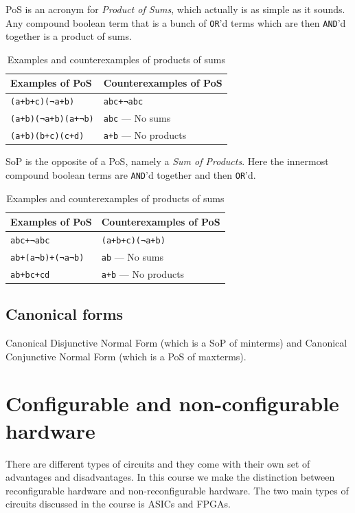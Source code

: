 \documentclass[a4paper,11pt]{report}
\newcommand{\enot}{¬}
\begin{document}
PoS is an acronym for \textit{Product of Sums}, which actually is as
simple as it sounds. Any compound boolean term that is a bunch of
\texttt{OR}'d terms which are then \texttt{AND}'d together is a
product of sums.

\begin{table}[H]
  \centering
  \begin{tabular}{l | l}
    \textbf{Examples of PoS} & \textbf{Counterexamples of PoS} \\ \hline
    \texttt{(a+b+c)(\enot{a}+b)}           & \texttt{abc+\enot{a}bc} \\
    \texttt{(a+b)(\enot{a}+b)(a+\enot{b})} & \texttt{abc} --- No sums \\
    \texttt{(a+b)(b+c)(c+d)}               & \texttt{a+b} --- No products
  \end{tabular}
  \caption[Example of PoS]{Examples and counterexamples of products of sums}%
  \label{tab:pos}
\end{table}

SoP is the opposite of a PoS, namely a \textit{Sum of Products}. Here
the innermost compound boolean terms are \texttt{AND}'d together and
then \texttt{OR}'d.

\begin{table}[H]
  \centering
  \begin{tabular}{l | l}
    \textbf{Examples of PoS} & \textbf{Counterexamples of PoS} \\ \hline
    \texttt{abc+\enot{a}bc}                    & \texttt{(a+b+c)(\enot{a}+b)} \\
    \texttt{ab+(a\enot{b})+(\enot{a}\enot{b})} & \texttt{ab} --- No sums \\
    \texttt{ab+bc+cd}                          & \texttt{a+b} --- No products
  \end{tabular}
  \caption[Example of PoS]{Examples and counterexamples of products of sums}%
  \label{tab:pos}
\end{table}

\subsection{Canonical forms}

Canonical Disjunctive Normal Form (which is a SoP of minterms) and
Canonical Conjunctive Normal Form (which is a PoS of
maxterms).

\newpage

\section{Configurable and non-configurable hardware}
There are different types of circuits and they come with their own set
of advantages and disadvantages. In this course we make the
distinction between reconfigurable hardware and non-reconfigurable
hardware. The two main types of circuits discussed in the course is
ASICs and FPGAs.
\end{document}
